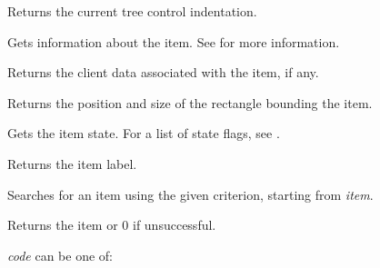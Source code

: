 \label{wxtreectrlgetindent}


Returns the current tree control indentation.

\label{wxtreectrlgetitem}


Gets information about the item. See  for more
information.

\label{wxtreectrlgetitemdata}


Returns the client data associated with the item, if any.

\label{wxtreectrlgetitemrect}


Returns the position and size of the rectangle bounding the item.

\label{wxtreectrlgetitemstate}


Gets the item state. For a list of state flags, see .

\label{wxtreectrlgetitemtext}


Returns the item label.

\label{wxtreectrlgetnextitem}


Searches for an item using the given criterion, starting from {\it item}.

Returns the item or 0 if unsuccessful.

{\it code} can be one of:

